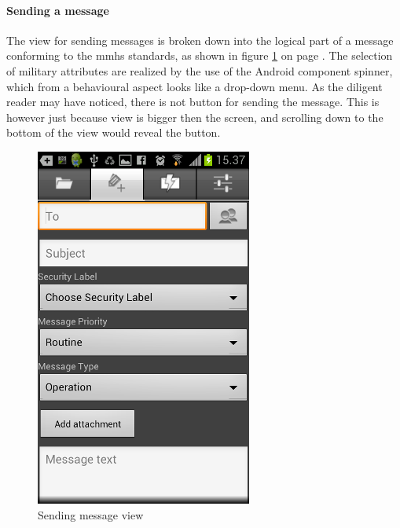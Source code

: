 \paragraph{Sending a message}\hfill 
\newline
The view for sending messages is broken down into the logical part of a message conforming to the \gls{mmhs} standards, as shown in figure \ref{fig:frontend_messagesend} on page \pageref{fig:frontend_messagesend}.
The selection of military attributes are realized by the use of the Android component spinner, which from a behavioural aspect looks like a drop-down menu.
As the diligent reader may have noticed, there is not button for sending the message. This is however just because view is bigger then the screen, and scrolling down to the bottom of the view would reveal the button. 

\begin{figure}[h!]
\begin{center}
\includegraphics{sendmessage_final}
\end{center}
\caption{Sending message view} \label{fig:frontend_messagesend}
\end{figure}

